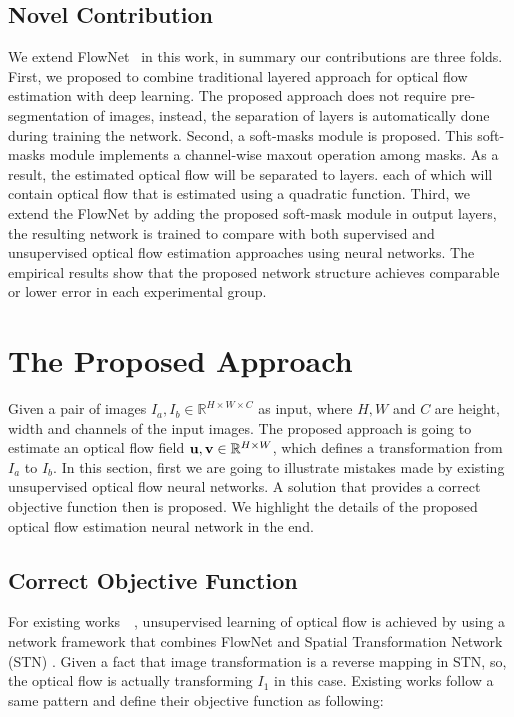 \documentclass[10pt,twocolumn,letterpaper]{article}
\begin{document}
\subsection{Novel Contribution}
We extend FlowNet~\cite{7410673} in this work, in summary our contributions are three folds. First, we proposed to combine traditional layered approach for optical flow estimation with deep learning. The proposed approach does not require pre-segmentation of images, instead, the separation of layers is automatically done during training the network. Second, a soft-masks module is proposed. This soft-masks module implements a channel-wise maxout operation among masks. As a result, the estimated optical flow will be separated to layers. each of which will contain optical flow that is estimated using a quadratic function. Third, we extend the FlowNet by adding the proposed soft-mask module in output layers, the resulting network is trained to compare with both supervised and unsupervised optical flow estimation approaches using neural networks. The empirical results show that the proposed network structure achieves comparable or lower error in each experimental group.

\section{The Proposed Approach}
Given a pair of images $I_a, I_b \in \mathbb{R}^{H\times W\times C}$ as input, where $H, W$ and $C$ are height, width and channels of the input images. The proposed approach is going to estimate an optical flow field $\bold{u}, \bold{v} \in \mathbb{R}^{H\times W}$, which defines a transformation from $I_a$ to $I_b$. In this section, first we are going to illustrate mistakes made by existing unsupervised optical flow neural networks. A solution that provides a correct objective function then is proposed. We highlight the details of the proposed optical flow estimation neural network in the end.

\subsection{Correct Objective Function}
\label{subsec: correct obj}
For existing works　\cite{ahmadi2016unsupervised}\cite{ren2017unsupervised}\cite{DBLP:journals/corr/YuHD16}, unsupervised learning of optical flow is achieved by using a network framework that combines FlowNet \cite{7410673} and Spatial Transformation Network (STN) \cite{NIPS2015_5854}. Given a fact that image transformation is a reverse mapping in STN, so, the optical flow is actually transforming $I_1$ in this case. Existing works follow a same pattern and define their objective function as following:
\end{document}
